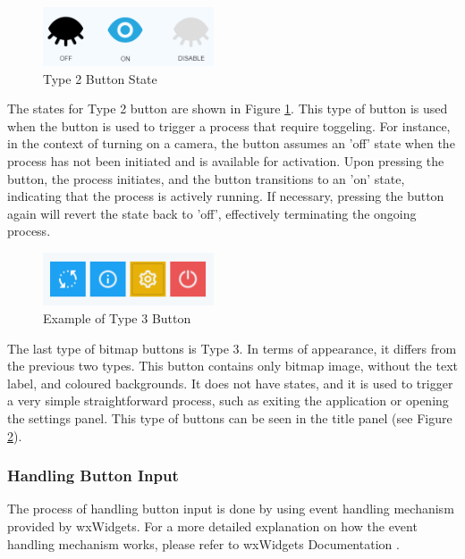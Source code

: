 \begin{figure}[!ht]
    \centering
    \includegraphics[width=0.45\textwidth]{texs/Part2/chapter4/image/type2state.png}
    \caption{Type 2 Button State}
    \label{fig:type2_state}
\end{figure}


The states for Type 2 button are shown in Figure \ref{fig:type2_state}. This type of button is used when the button is used to trigger a process that require toggeling. For instance, in the context of turning on a camera, the button assumes an 'off' state when the process has not been initiated and is available for activation. Upon pressing the button, the process initiates, and the button transitions to an 'on' state, indicating that the process is actively running. If necessary, pressing the button again will revert the state back to 'off', effectively terminating the ongoing process.

\begin{figure}[!ht]
    \centering
    \includegraphics[width=0.45\textwidth]{texs/Part2/chapter4/image/type3state.png}
    \caption{Example of Type 3 Button}
    \label{fig:type3_state}
\end{figure}

The last type of bitmap buttons is Type 3. In terms of appearance, it differs from the previous two types. This button contains only bitmap image, without the text label, and coloured backgrounds. It does not have states, and it is used to trigger a  very simple straightforward process, such as exiting the application or opening the settings panel.
This type of buttons can be seen in the title panel (see Figure \ref{fig:type3_state}).

\subsubsection{Handling Button Input}
\label{subsubsec:handling_button_input}
The process of handling button input is done by using event handling mechanism provided by wxWidgets. For a more detailed explanation on how the event handling mechanism works, please refer to wxWidgets Documentation \cite{wxWidgetsEvent}.

